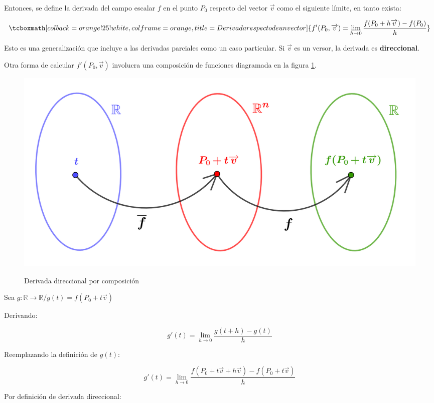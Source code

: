 \documentclass{article}
\renewcommand{\Bbb}{\mathbb}
\begin{document}
Entonces, se define la derivada del campo escalar $f$ en el punto $P_0$ respecto del vector $\overrightarrow{v}$ como el siguiente límite, en tanto exista:

\begin{equation}
\tcboxmath[colback=orange!25!white,colframe=orange, title=Derivada respecto de un vector]
{ f'(P_0, \overrightarrow{v}) = \lim_{h \rightarrow 0} \frac{f(P_0 + h \overrightarrow{v})-f(P_0)}{h} }
\end{equation}

Esto es una generalización que incluye a las derivadas parciales como un caso particular. Si $\overrightarrow{v}$ es un versor, la derivada es \textbf{direccional}.

Otra forma de calcular $f'(P_0, \overrightarrow{v})$ involucra una composición de funciones diagramada en la figura \ref{fig:deriv_direcc_comp}.

\begin{figure}[ht]
\centering
\caption{Derivada direccional por composición}
\includegraphics[scale=0.75]{img/teo_fig010_deriv_direcc.png}
\label{fig:deriv_direcc_comp}
\end{figure} 

Sea $g:\Bbb R \rightarrow \Bbb R / g(t) = f(P_0 + t \overrightarrow{v})$

Derivando:

\begin{equation}
g'(t) = \lim_{h \rightarrow 0} \frac{g(t+h)-g(t)}{h}
\end{equation}

Reemplazando la definición de $g(t)$:

\begin{equation}
g'(t) = \lim_{h \rightarrow 0} \frac{f(P_0 + t \overrightarrow{v} + h \overrightarrow{v}) - f(P_0 + t \overrightarrow{v})}{h}
\end{equation}

Por definición de derivada direccional:
\end{document}
